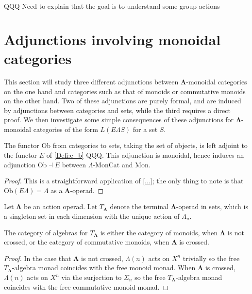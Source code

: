 \documentclass{amsbook} %
\newcommand{\ML}{\mathbf{\Lambda}}
\newcommand{\EL}{E\Lambda}
\newcommand{\ob}{\textrm{Ob}}
\newcommand{\lmc}{\Lambda\mbox{-}\textrm{MonCat}}
\newcommand{\mon}{\ensuremath{\textrm{Mon}}}
\numberwithin{section}{chapter}
\begin{document}
QQQ Need to explain that the goal is to understand some group actions

\section{Adjunctions involving monoidal categories}

This section will study three different adjunctions between $\ML$-monoidal categories on the one hand and categories such as that of monoids or commutative monoids on the other hand. Two of these adjunctions are purely formal, and are induced by adjunctions between categories and sets, while the third requires a direct proof. We then investigate some simple consequences of these adjunctions for $\ML$-monoidal categories of the form $L(E\Lambda S)$ for a set $S$.

\begin{prop}\label{Ob-E_adj}
The functor $\ob$ from categories to sets, taking the set of objects, is left adjoint to the functor $E$ of \cref{Defi:e_b} QQQ. This adjunction is monoidal, hence induces an adjunction $\ob \dashv E$ between $\lmc$ and $\mon$.
\end{prop}
\begin{proof}
This is a straightforward application of \cref{...}; the only thing to note is that $\ob(\EL) = \Lambda$ as a $\ML$-operad.

\end{proof}

\begin{Defi}
Let $\ML$ be an action operad. Let $T_{\ML}$ denote the terminal $\ML$-operad in sets, which is a singleton set in each dimension with the unique action of $\Lambda_n$.
\end{Defi}

\begin{lem}
The category of algebras for $T_{\ML}$ is either the category of monoids, when $\ML$ is not crossed, or the category of commutative monoids, when $\ML$ is crossed.
\end{lem}
\begin{proof}
In the case that $\ML$ is not crossed, $\Lambda(n)$ acts on $X^n$ trivially so the free $T_{\ML}$-algebra monad coincides with the free monoid monad. When $\ML$ is crossed, $\Lambda(n)$ acts on $X^n$ via the surjection to $\Sigma_n$ so the free $T_{\ML}$-algebra monad coincides with the free commutative monoid monad.
\end{proof}
\end{document}
